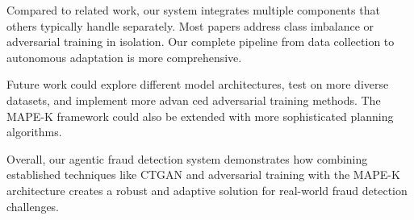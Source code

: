 Compared to related work, our system integrates multiple components that others typically handle separately. Most papers address class imbalance or adversarial training in isolation. Our complete pipeline from data collection to autonomous adaptation is more comprehensive.

Future work could explore different model architectures, test on more diverse datasets, and implement more advan    ced adversarial training methods. The MAPE-K framework could also be extended with more sophisticated planning algorithms.

Overall, our agentic fraud detection system demonstrates how combining established techniques like CTGAN and adversarial training with the MAPE-K architecture creates a robust and adaptive solution for real-world fraud detection challenges.